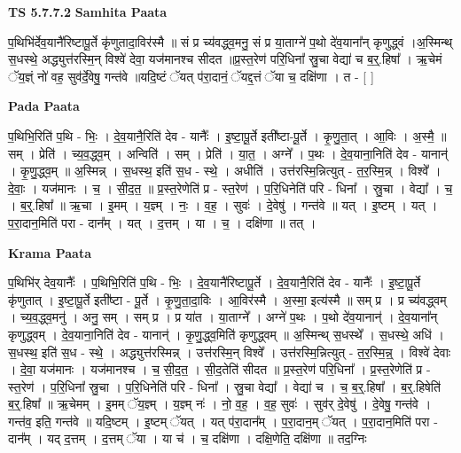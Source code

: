 \documentclass[17pt]{extarticle}
\begin{document}
\textbf{TS 5.7.7.2 } \newline
\textbf{Samhita Paata} \newline

प॒थिभि॑र्देव॒यानै॑रिष्टापू॒र्ते कृ॑णुतादा॒विर॑स्मै ॥ सं प्र च्य॑वद्ध्व॒मनु॒ सं प्र या॒ताग्ने॑ प॒थो दे॑व॒याना᳚न् कृणुद्ध्वं ।अ॒स्मिन्थ् स॒धस्थे॒ अद्ध्युत्त॑रस्मि॒न् विश्वे॑ देवा॒ यज॑मानश्च सीदत ॥प्र॒स्त॒रेण॑ परि॒धिना᳚ स्रु॒चा वेद्या॑ च ब॒र्॒.हिषा᳚ । ऋ॒चेमं ॅय॒ज्ञ्ं नो॑ वह॒ सुव॑र्दे॒वेषु॒ गन्त॑वे ॥यदि॒ष्टं ॅयत् प॑रा॒दानं॒ ॅयद्द॒त्तं ॅया च॒ दक्षि॑णा । त - [  ] \newline

\textbf{Pada Paata} \newline

प॒थिभि॒रिति॑ प॒थि - भिः॒ । दे॒व॒यानै॒रिति॑ देव - यानैः᳚ । इ॒ष्टा॒पू॒र्ते इती᳚ष्टा-पू॒र्ते । कृ॒णु॒ता॒त् । आ॒विः । अ॒स्मै॒ ॥ सम् । प्रेति॑ । च्य॒व॒द्ध्व॒म् । अन्विति॑ । सम् । प्रेति॑ । या॒त॒ । अग्ने᳚ । प॒थः । दे॒व॒याना॒निति॑ देव - यानान्॑ । कृ॒णु॒द्ध्व॒म् ॥ अ॒स्मिन्न् । स॒धस्थ॒ इति॑ स॒ध - स्थे॒ । अधीति॑ । उत्त॑रस्मि॒न्नित्युत् - त॒र॒स्मि॒न्न् । विश्वे᳚ । दे॒वाः॒ । यज॑मानः । च॒ । सी॒द॒त॒ ॥ प्र॒स्त॒रेणेति॑ प्र - स्त॒रेण॑ । प॒रि॒धिनेति॑ परि - धिना᳚ । स्रु॒चा । वेद्या᳚ । च॒ । ब॒र्॒.हिषा᳚ ॥ ऋ॒चा । इ॒मम् । य॒ज्ञ्म् । नः॒ । व॒ह॒ । सुवः॑ । दे॒वेषु॑ । गन्त॑वे ॥ यत् । इ॒ष्टम् । यत् । प॒रा॒दान॒मिति॑ परा - दान᳚म् । यत् । द॒त्तम् । या । च॒ । दक्षि॑णा ॥ तत् ।  \newline


\textbf{Krama Paata} \newline

प॒थिभि॑र् देव॒यानैः᳚ । प॒थिभि॒रिति॑ प॒थि - भिः॒ । दे॒व॒यानै॑रिष्टापू॒र्ते । दे॒व॒यानै॒रिति॑ देव - यानैः᳚ । इ॒ष्टा॒पू॒र्ते कृ॑णुतात् । इ॒ष्टा॒पू॒र्ते इती᳚ष्टा - पू॒र्ते । कृ॒णु॒ता॒दा॒विः । आ॒विर॑स्मै । अ॒स्मा॒ इत्य॑स्मै ॥ सम् प्र । प्र च्य॑वद्ध्वम् । च्य॒व॒द्ध्व॒मनु॑ । अनु॒ सम् । सम् प्र । प्र या॑त । या॒ताग्ने᳚ । अग्ने॑ प॒थः । प॒थो दे॑व॒यानान्॑ । दे॒व॒याना᳚न् कृणुद्ध्वम् । दे॒व॒याना॒निति॑ देव - यानान्॑ । कृ॒णु॒द्ध्व॒मिति॑ कृणुद्ध्वम् ॥ अ॒स्मिन्थ् स॒धस्थे᳚ । स॒धस्थे॒ अधि॑ । स॒धस्थ॒ इति॑ स॒ध - स्थे॒ । अद्ध्युत्त॑रस्मिन्न् । उत्त॑रस्मि॒न् विश्वे᳚ । उत्त॑रस्मि॒न्नित्युत् - त॒र॒स्मि॒न्न्॒ । विश्वे॑ देवाः । दे॒वा॒ यज॑मानः । यज॑मानश्च । च॒ सी॒द॒त॒ । सी॒द॒तेति॑ सीदत ॥ प्र॒स्त॒रेण॑ परि॒धिना᳚ । प्र॒स्त॒रेणेति॑ प्र - स्त॒रेण॑ । प॒रि॒धिना᳚ स्रु॒चा । प॒रि॒धिनेति॑ परि - धिना᳚ । स्रु॒चा वेद्या᳚ । वेद्या॑ च । च॒ ब॒र्॒.हिषा᳚ । ब॒र्॒.हिषेति॑ ब॒र्॒.हिषा᳚ ॥ ऋ॒चेमम् । इ॒मम् ॅय॒ज्ञ्म् । य॒ज्ञ्म् नः॑ । नो॒ व॒ह॒ । व॒ह॒ सुवः॑ । सुव॑र् दे॒वेषु॑ । दे॒वेषु॒ गन्त॑वे । गन्त॑व॒ इति॒ गन्त॑वे ॥ यदि॒ष्टम् । इ॒ष्टम् ॅयत् । यत् प॑रा॒दान᳚म् । प॒रा॒दान॒म् ॅयत् । प॒रा॒दान॒मिति॑ परा - दान᳚म् । यद् द॒त्तम् । द॒त्तम् ॅया । या च॑ । च॒ दक्षि॑णा । दक्षि॒णेति॒ दक्षि॑णा ॥ तद॒ग्निः \newline
\end{document}
